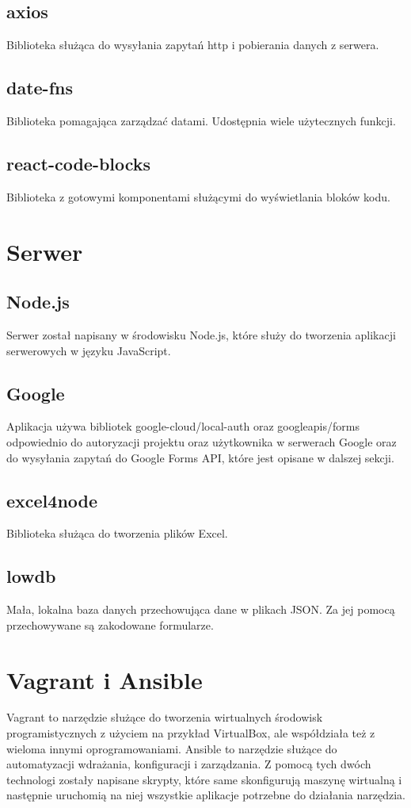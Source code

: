 \subsection{axios}
Biblioteka służąca do wysyłania zapytań http i pobierania danych z serwera.

\subsection{date-fns}
Biblioteka pomagająca zarządzać datami. Udostępnia wiele użytecznych funkcji.

\subsection{react-code-blocks}
Biblioteka z gotowymi komponentami służącymi do wyświetlania bloków kodu.

\section{Serwer}

\subsection{Node.js}
Serwer został napisany w środowisku Node.js, które służy do tworzenia aplikacji
serwerowych w języku JavaScript.

\subsection{Google}
Aplikacja używa bibliotek google-cloud/local-auth oraz googleapis/forms
odpowiednio do autoryzacji projektu oraz użytkownika w serwerach Google 
oraz do wysyłania zapytań do Google Forms API, które jest opisane w dalszej sekcji.

\subsection{excel4node}
Biblioteka służąca do tworzenia plików Excel.

\subsection{lowdb}
Mała, lokalna baza danych przechowująca dane w plikach JSON. Za jej pomocą
przechowywane są zakodowane formularze.

\section{Vagrant i Ansible}
Vagrant to narzędzie służące do tworzenia wirtualnych środowisk programistycznych
z użyciem na przykład VirtualBox, ale współdziała też z wieloma innymi oprogramowaniami.
Ansible to narzędzie służące do automatyzacji
wdrażania, konfiguracji i zarządzania. Z pomocą tych dwóch technologi zostały
napisane skrypty, które same skonfigurują maszynę wirtualną i następnie uruchomią
na niej wszystkie aplikacje potrzebne do działania narzędzia. 

